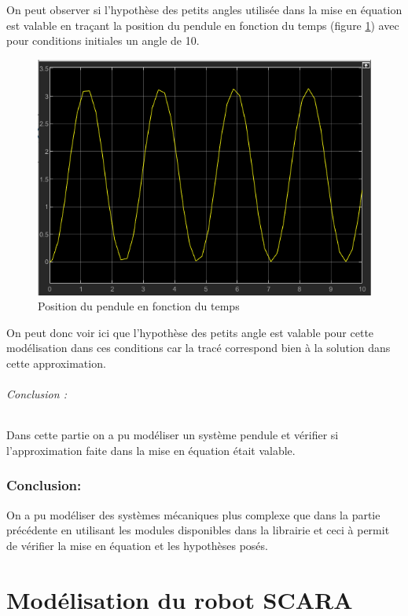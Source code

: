 \documentclass[12pt,a4paper]{article}
\begin{document}
On peut observer si l'hypothèse des petits angles utilisée dans la mise en équation est valable en traçant la position du pendule en fonction du temps (figure \ref{trace_pendule}) avec pour conditions initiales un angle de 10\degres.

\begin{figure}[h!]
\centering
\includegraphics[scale=0.6]{trace_pendule.png}
\caption{Position du pendule en fonction du temps}
\label{trace_pendule}
\end{figure}

On peut donc voir ici que l'hypothèse des petits angle est valable pour cette modélisation dans ces conditions car la tracé correspond bien à la solution dans cette approximation.

\paragraph*{Conclusion :}
Dans cette partie on a pu modéliser un système pendule et vérifier si l'approximation faite dans la mise en équation était valable. 

\section{Conclusion:} 
On a pu modéliser des systèmes mécaniques plus complexe que dans la partie précédente en utilisant les modules disponibles dans la librairie et ceci à permit de vérifier la mise en équation et les hypothèses posés.

\part{Modélisation du robot SCARA}
\end{document}

